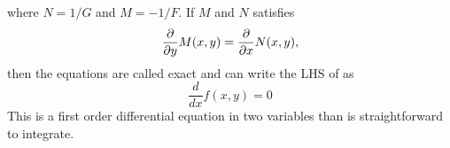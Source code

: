 
where $N = 1/G$ and $M=-1/F$.
If $M$ and $N$ satisfies 
\begin{equation}
\frac{\partial}{\partial y} M(x,y) = \frac{\partial}{\partial x}
N(x,y) \/,
\end{equation}
 then the equations are called exact and can write the LHS of
  as 
\begin{equation}
\frac{d}{dx} f(x,y) = 0
\end{equation}
This is a first order differential equation in two variables than is
straightforward to integrate. 
